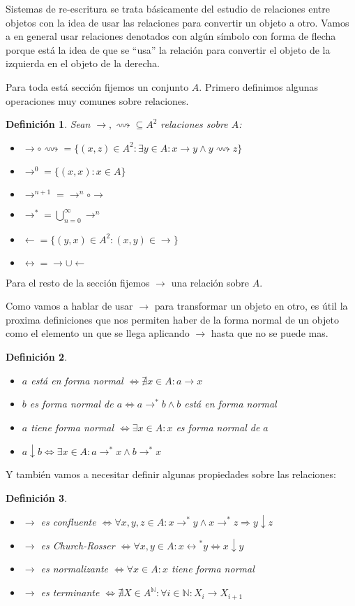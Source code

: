 \documentclass{report}
\theoremstyle{customstyle}
\newtheorem{definition}{Definición}[chapter]
\theoremstyle{factstyle}
\begin{document}
Sistemas de re-escritura se trata básicamente del estudio de relaciones entre objetos con la idea de usar las relaciones para convertir un objeto a otro. Vamos a en general usar relaciones denotados con algún símbolo con forma de flecha porque está la idea de que se ``usa'' la relación para convertir el objeto de la izquierda en el objeto de la derecha.

Para toda está sección fijemos un conjunto $A$. Primero definimos algunas operaciones muy comunes sobre relaciones.

\begin{definition} Sean $→, ⟿ ⊆ A^2$ relaciones sobre $A$:
  \begin{itemize}
    \item $→ ∘ ⟿ = \{(x, z) ∈ A^2 : ∃y ∈ A : x → y ∧ y ⟿ z\}$
    \item $→^0 = \{(x, x) : x ∈ A\}$
    \item $→^{n + 1} = →^n ∘ →$
    \item $→^* = ⋃_{n = 0}^∞ →^n$
    \item $← = \{(y, x) ∈ A^2 : (x, y) ∈ →\}$
    \item $↔ = → ∪ ←$
  \end{itemize}
\end{definition}

Para el resto de la sección fijemos $→$ una relación sobre $A$.

Como vamos a hablar de usar $→$ para transformar un objeto en otro, es útil la proxima definiciones que nos permiten haber de la forma normal de un objeto como el elemento un que se llega aplicando $→$ hasta que no se puede mas.

\begin{definition}\
  \begin{itemize}
    \item $a$ está en forma normal $⇔ ∄x ∈ A : a → x$
    \item $b$ es forma normal de $a ⇔ a →^* b ∧ b$ está en forma normal
    \item $a$ tiene forma normal $⇔ ∃x ∈ A : x$ es forma normal de $a$
    \item $a ↓ b ⇔ ∃x ∈ A : a →^* x ∧ b →^* x$
  \end{itemize}
\end{definition}

Y también vamos a necesitar definir algunas propiedades sobre las relaciones:

\begin{definition}\
  \begin{itemize}
    \item $→$ es confluente $⇔ ∀x, y, z ∈ A : x →^* y ∧ x →^*z ⇒ y ↓ z$
    \item $→$ es Church-Rosser $⇔ ∀x, y ∈ A : x ↔️^* y ⇔ x ↓ y$
    \item $→$ es normalizante $⇔ ∀x ∈ A : x$ tiene forma normal
    \item $→$ es terminante $⇔ ∄X ∈ A^ℕ : ∀i ∈ ℕ : X_i → X_{i + 1}$
  \end{itemize}
\end{definition}
\end{document}
